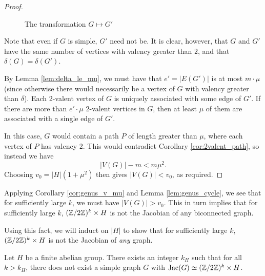 \documentclass{amsart}
\begin{document}
\begin{proof}
\begin{figure}[H]
\begin{center}
\begin{tikzpicture}
      \end{tikzpicture}
      \caption{The transformation $G \mapsto G'$}
    \end{center}
  \end{figure}

  Note that even if $G$ is simple, $G'$ need not be. It is clear,
  however, that $G$ and $G'$ have the same number of vertices with
  valency greater than $2$, and that $\delta(G) = \delta(G')$.

  By Lemma \ref{lem:delta_le_mu}, we must have that $e' = |E(G')|$ is
  at most $m \cdot \mu$ (since otherwise there would necessarily be a
  vertex of $G$ with valency greater than $\delta$). Each 2-valent
  vertex of $G$ is uniquely associated with some edge of $G'$. If
  there are more than $e' \cdot \mu$ 2-valent vertices in $G$, then at
  least $\mu$ of them are associated with a single edge of $G'$.

  In this case, $G$ would contain a path $P$ of length greater than
  $\mu$, where each vertex of $P$ has valency $2$. This would
  contradict Corollary \ref{cor:2valent_path}, so instead we have
  \[
  |V(G)| - m < m\mu^2.
  \] 
  Choosing $v_0 = |H|(1 + \mu^2)$ then gives $|V(G)| < v_0$, as
  required.
\end{proof}

Applying Corollary \ref{cor:genus_v_mu} and Lemma
\ref{lem:genus_cycle}, we see that for sufficiently large $k$, we must
have $|V(G)| > v_0$. This in turn implies that for sufficiently large
$k$, $(\Z/2\Z)^k \times H$ is not the Jacobian of any biconnected
graph.

Using this fact, we will induct on $|H|$ to show that for sufficiently
large $k$, $(\Z/2\Z)^k \times H$ is not the Jacobian of \emph{any}
graph.

\begin{thm}
  \label{thm:2group_product}
  Let $H$ be a finite abelian group. There exists an integer $k_H$
  such that for all $k > k_H$, there does not exist a simple graph $G$
  with $\Jac(G) \simeq (\Z/2\Z)^k \times H$.
\end{thm}
  
\end{document}
